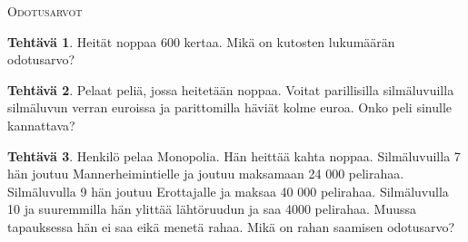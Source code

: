 \documentclass[12pt,leqno,a4paper,oneside]{amsart}
\theoremstyle{definition}
\newtheorem{exercise}{Tehtävä}
\theoremstyle{remark}
\numberwithin{equation}{section}
\begin{document}
\textsc{Odotusarvot}

\begin{exercise}
 Heität noppaa 600 kertaa. Mikä on kutosten lukumäärän odotusarvo?
\end{exercise}

\begin{exercise}
 Pelaat peliä, jossa heitetään noppaa. Voitat parillisilla silmäluvuilla silmäluvun verran euroissa ja parittomilla häviät 
 kolme euroa. Onko peli sinulle kannattava?
\end{exercise}


\begin{exercise}
 Henkilö pelaa Monopolia. Hän heittää kahta noppaa. Silmäluvuilla 7 hän joutuu Mannerheimintielle ja joutuu maksamaan 24 000 pelirahaa. Silmäluvulla
 9 hän joutuu Erottajalle ja maksaa 40 000 pelirahaa. Silmäluvulla 10 ja suuremmilla hän ylittää lähtöruudun ja saa 4000 pelirahaa. Muussa tapauksessa
 hän ei saa eikä menetä rahaa. Mikä on rahan saamisen
 odotusarvo?
 
\end{exercise}
\end{document}
